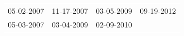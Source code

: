 \begin{supertabular}{llll}
 05-02-2007 &  11-17-2007 &  03-05-2009 &  09-19-2012 \\
 05-03-2007 &  03-04-2009 &  02-09-2010 &             \\
\end{supertabular}
